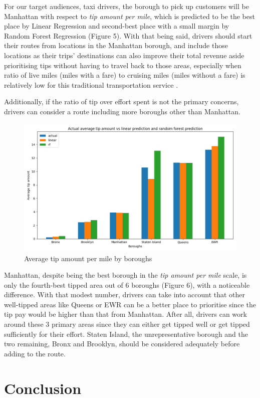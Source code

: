 \documentclass[11pt]{article}
\begin{document}
For our target audiences, taxi drivers, the borough to pick up customers will be Manhattan with respect to \textit{tip amount per mile}, which is predicted to be the best place by Linear Regression and second-best place with a small margin by Random Forest Regression (Figure 5). With that being said, drivers should start their routes from locations in the Manhattan borough, and include those locations as their trips' destinations can also improve their total revenue aside prioritising tips without having to travel back to those areas, especially when ratio of live miles (miles with a fare) to cruising miles (miles without a fare) is relatively low for this traditional transportation service \cite{miles_ratio}.

Additionally, if the ratio of tip over effort spent is not the primary concerns, drivers can consider a route including more boroughs other than Manhattan.

\begin{figure}[h]
    \centering
    \includegraphics[width=0.7\linewidth]{plots/bar_chart_tip_amount.png}
    \caption{Average tip amount per mile by boroughs}
\end{figure}

Manhattan, despite being the best borough in the \textit{tip amount per mile} scale, is only the fourth-best tipped area out of 6 boroughs (Figure 6), with a noticeable difference. With that modest number, drivers can take into account that other well-tipped areas like Queens or EWR can be a better place to prioritise since the tip pay would be higher than that from Manhattan. After all, drivers can work around these 3 primary areas since they can either get tipped well or get tipped sufficiently for their effort. Staten Island, the unrepresentative borough and the two remaining, Bronx and Brooklyn, should be considered adequately before adding to the route.

\section{Conclusion}
\end{document}
